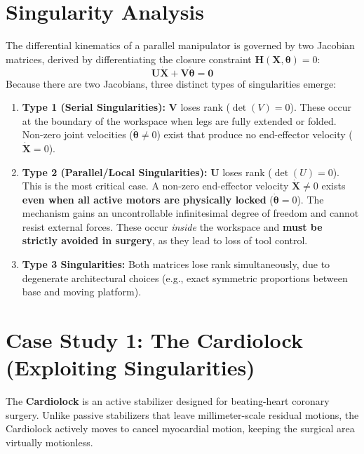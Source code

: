 \documentclass[11pt,a4paper,twoside]{report}
\begin{document}
\section{Singularity Analysis}
The differential kinematics of a parallel manipulator is governed by two Jacobian matrices, derived by differentiating the closure constraint $\mathbf{H}(\mathbf{X}, \boldsymbol{\theta}) = 0$:
\begin{equation}
    \mathbf{U}\dot{\mathbf{X}} + \mathbf{V}\dot{\boldsymbol{\theta}} = \mathbf{0}
\end{equation}
Because there are two Jacobians, three distinct types of singularities emerge:
\begin{enumerate}
    \item \textbf{Type 1 (Serial Singularities):} $\mathbf{V}$ loses rank ($\det(V)=0$). These occur at the boundary of the workspace when legs are fully extended or folded. Non-zero joint velocities ($\dot{\boldsymbol{\theta}} \neq 0$) exist that produce no end-effector velocity ($\dot{\mathbf{X}} = 0$).
    \item \textbf{Type 2 (Parallel/Local Singularities):} $\mathbf{U}$ loses rank ($\det(U)=0$). This is the most critical case. A non-zero end-effector velocity $\dot{\mathbf{X}} \neq 0$ exists \textbf{even when all active motors are physically locked} ($\dot{\boldsymbol{\theta}} = 0$). The mechanism gains an uncontrollable infinitesimal degree of freedom and cannot resist external forces. These occur \textit{inside} the workspace and \textbf{must be strictly avoided in surgery}, as they lead to loss of tool control.
    \item \textbf{Type 3 Singularities:} Both matrices lose rank simultaneously, due to degenerate architectural choices (e.g., exact symmetric proportions between base and moving platform).
\end{enumerate}

\section{Case Study 1: The Cardiolock (Exploiting Singularities)}
The \textbf{Cardiolock} is an active stabilizer designed for beating-heart coronary surgery. Unlike passive stabilizers that leave millimeter-scale residual motions, the Cardiolock actively moves to cancel myocardial motion, keeping the surgical area virtually motionless.
\end{document}
